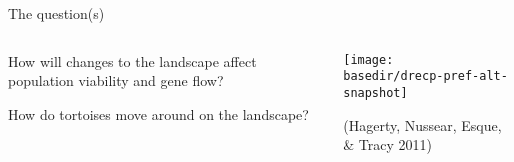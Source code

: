 \documentclass{beamer}
\newcommand{\basedir}{files}
\begin{document}
\begin{frame}{The question(s)}
  \begin{columns}[c]
    \begin{column}{.4\textwidth}

        {\Large How will changes to the landscape affect population viability and gene flow?}

        \vspace{3em}

        {\newthing \large How do tortoises move around on the landscape?}


    \end{column}
    \begin{column}{.6\textwidth}
      \begin{center}

        \vfill
        \texttt{[image: \\basedir/drecp-pref-alt-snapshot]}
        \vfill

           {\aside (Hagerty, Nussear, Esque, \& Tracy 2011)}

      \end{center}
    \end{column}
  \end{columns}
\end{frame}
\end{document}
